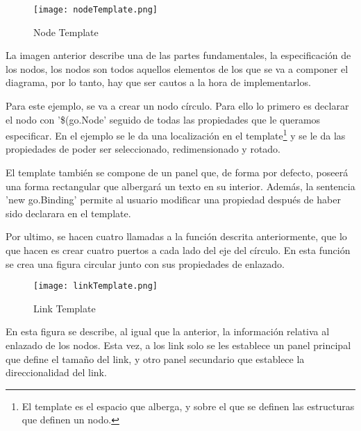 \vspace{5mm}

\begin{figure}[H]
	\centering
	\texttt{[image: nodeTemplate.png]}
	\caption{Node Template}\label{fig:nodeTemplate}
\end{figure}
\vspace{5mm}

La imagen anterior describe una de las partes fundamentales, la especificación de los nodos, los nodos son todos aquellos elementos de los que se va a componer el diagrama, por lo tanto, hay que ser cautos a la hora de implementarlos.

\vspace{5mm}

Para este ejemplo, se va a crear un nodo círculo. Para ello lo primero es declarar el nodo con '\$(go.Node' seguido de todas las propiedades que le queramos especificar. En el ejemplo se le da una localización en el template\footnote{El template es el espacio que alberga, y sobre el que se definen las estructuras que definen un nodo.} y se le da las propiedades de poder ser seleccionado, redimensionado y rotado.

\vspace{5mm}

El template también se compone de un panel que, de forma por defecto, poseerá una forma rectangular que albergará un texto en su interior. Además, la sentencia 'new go.Binding' permite al usuario modificar una propiedad después de haber sido declarara en el template.

\vspace{5mm}

Por ultimo, se hacen cuatro llamadas a la función descrita anteriormente, que lo que hacen es crear cuatro puertos a cada lado del eje del círculo. En esta función se crea una figura circular junto con sus propiedades de enlazado.

\vspace{5mm}

\begin{figure}[H]
	\centering
	\texttt{[image: linkTemplate.png]}
	\caption{Link Template}\label{fig:linkTemplate}
\end{figure}
\vspace{5mm}

En esta figura se describe, al igual que la anterior, la información relativa al enlazado de los nodos. Esta vez, a los link solo se les establece un panel principal que define el tamaño del link, y otro panel secundario que establece la direccionalidad del link.

